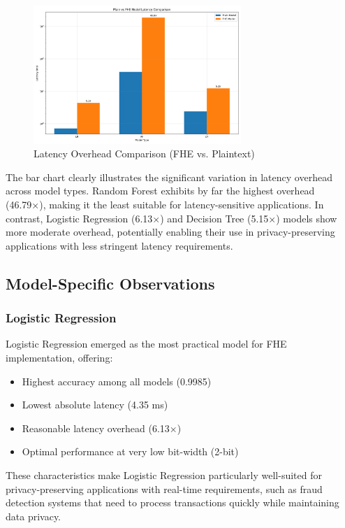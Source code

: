 \documentclass[a4paper,12pt]{article}
\begin{document}
\begin{figure}[h]
\centering
\includegraphics[width=0.7\textwidth]{results/overall_latency_comparison.png}
\caption{Latency Overhead Comparison (FHE vs. Plaintext)}
\label{fig:latency_overhead}
\end{figure}

The bar chart clearly illustrates the significant variation in latency overhead across model types. Random Forest exhibits by far the highest overhead (46.79×), making it the least suitable for latency-sensitive applications. In contrast, Logistic Regression (6.13×) and Decision Tree (5.15×) models show more moderate overhead, potentially enabling their use in privacy-preserving applications with less stringent latency requirements.

\subsection{Model-Specific Observations}

\subsubsection{Logistic Regression}
Logistic Regression emerged as the most practical model for FHE implementation, offering:
\begin{itemize}
    \item Highest accuracy among all models (0.9985)
    \item Lowest absolute latency (4.35 ms)
    \item Reasonable latency overhead (6.13×)
    \item Optimal performance at very low bit-width (2-bit)
\end{itemize}

These characteristics make Logistic Regression particularly well-suited for privacy-preserving applications with real-time requirements, such as fraud detection systems that need to process transactions quickly while maintaining data privacy.
\end{document}
